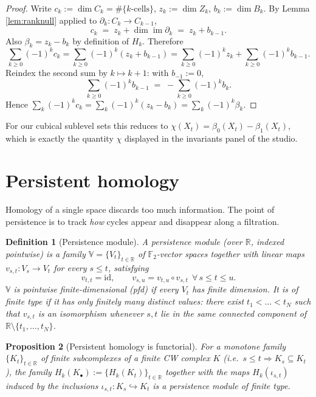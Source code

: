 \documentclass[11pt]{article}
\theoremstyle{persdef}
\newtheorem{definition}{Definition}[section]
\newtheorem{proposition}[definition]{Proposition}
\newcommand{\R}{\mathbb{R}}
\newcommand{\F}{\mathbb{F}}
\newcommand{\Ftwo}{\F_2}
\newcommand{\X}{X}
\DeclareMathOperator{\imop}{im}
\newcommand{\Hk}[1]{H_{#1}}
\newcommand{\Ck}[1]{C_{#1}}
\newcommand{\Zk}[1]{Z_{#1}}
\newcommand{\Bk}[1]{B_{#1}}
\newcommand{\bnd}{\partial}
\begin{document}
\begin{proof}
Write $c_k := \dim\Ck{k} = \#\{k\text{-cells}\}$, $z_k := \dim\Zk{k}$, $b_k := \dim\Bk{k}$. By Lemma \ref{lem:ranknull} applied to $\bnd_k:\Ck{k}\to\Ck{k-1}$,
\[
c_k \;=\; z_k + \dim\imop\bnd_k \;=\; z_k + b_{k-1}.
\]
Also $\beta_k = z_k - b_k$ by definition of $\Hk{k}$. Therefore
\[
\sum_{k\geq 0}(-1)^k c_k = \sum_{k\geq 0}(-1)^k(z_k + b_{k-1}) = \sum_{k\geq 0}(-1)^k z_k + \sum_{k\geq 0}(-1)^k b_{k-1}.
\]
Reindex the second sum by $k\mapsto k+1$: with $b_{-1}:=0$,
\[
\sum_{k\geq 0}(-1)^k b_{k-1} \;=\; -\sum_{k\geq 0}(-1)^k b_k.
\]
Hence $\sum_k(-1)^k c_k = \sum_k(-1)^k(z_k - b_k) = \sum_k(-1)^k\beta_k$.
\end{proof}

\noindent
For our cubical sublevel sets this reduces to $\chi(\X_t) = \beta_0(\X_t) - \beta_1(\X_t)$, which is exactly the quantity $\chi$ displayed in the invariants panel of the studio.

\section{Persistent homology}

Homology of a single space discards too much information. The point of persistence is to track \emph{how} cycles appear and disappear along a filtration.

\begin{definition}[Persistence module]\label{def:persmodule}
A \emph{persistence module} (over $\R$, indexed pointwise) is a family $\mathbb{V} = \{V_t\}_{t\in\R}$ of $\Ftwo$-vector spaces together with linear maps $v_{s,t}:V_s\to V_t$ for every $s\leq t$, satisfying
\[
v_{t,t} = \mathrm{id},\qquad v_{s,u} = v_{t,u}\circ v_{s,t}\ \ \forall\, s\leq t\leq u.
\]
$\mathbb{V}$ is \emph{pointwise finite-dimensional (pfd)} if every $V_t$ has finite dimension. It is of \emph{finite type} if it has only finitely many distinct values: there exist $t_1<\dots<t_N$ such that $v_{s,t}$ is an isomorphism whenever $s,t$ lie in the same connected component of $\R\setminus\{t_1,\dots,t_N\}$.
\end{definition}

\begin{proposition}[Persistent homology is functorial]\label{prop:funct}
For a monotone family $\{K_t\}_{t\in\R}$ of finite subcomplexes of a finite CW complex $K$ (i.e.\ $s\leq t\Rightarrow K_s\subseteq K_t$), the family $\Hk{k}(K_\bullet) := \{\Hk{k}(K_t)\}_{t\in\R}$ together with the maps $\Hk{k}(\iota_{s,t})$ induced by the inclusions $\iota_{s,t}:K_s\hookrightarrow K_t$ is a persistence module of finite type.
\end{proposition}
\end{document}
